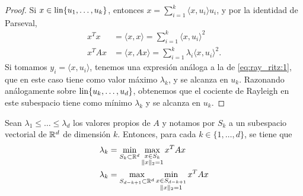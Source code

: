 \begin{proof}
    Si $x \in \operatorname{lin}\{u_1,\dots,u_{k}\}$, entonces $x = \sum_{i=1}^{k} \langle x, u_i \rangle u_i$, y por la identidad de Parseval,
    \begin{align*}
        x^Tx &= \langle x, x \rangle = \sum_{i=1}^{k} \langle x, u_i \rangle^2 \\
        x^TAx &= \langle x, Ax \rangle = \sum_{i=1}^{k} \lambda_i \langle x, u_i \rangle^2.
    \end{align*}
    Si tomamos $y_i = \langle x, u_i \rangle$, tenemos una expresión análoga a la de \ref{eq:ray_ritz:1}, que en este caso tiene como valor máximo $\lambda_k$, y se alcanza en $u_k$. Razonando análogamente sobre $\operatorname{lin}\{u_k,\dots,u_{d}\}$, obtenemos que el cociente de Rayleigh en este subespacio tiene como mínimo $\lambda_k$ y se alcanza en $u_k$.
\end{proof}

\begin{thm} \label{thm:courant_fischer}
    Sean $\lambda_1 \le \dots \le \lambda_d$ los valores propios de $A$ y notamos por $S_k$ a un subespacio vectorial de $\mathbb{R}^d$ de dimensión $k$. Entonces, para cada $k \in \{1,\dots,d\}$, se tiene que
    \begin{align}
        \lambda_k &= \min_{S_{k} \subset \mathbb{R}^d} \max_{\substack{x \in S_{k} \\ \|x\|_2 = 1}} x^TAx \label{eq:courant_fischer:1}\\ 
        \lambda_k &= \max_{S_{d-k+1} \subset \mathbb{R}^d} \min_{\substack{x \in S_{d-k+1} \\ \|x\|_2 = 1}} x^TAx \label{eq:courant_fischer:2}
    \end{align}
\end{thm}

